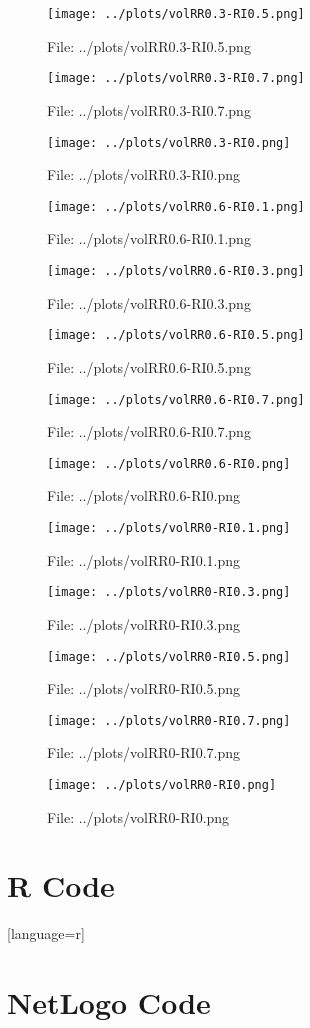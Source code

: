 \documentclass[a4paper, 11pt]{report}
\begin{document}
\begin{figure}[h] \caption{File: ../plots/volRR0.3-RI0.5.png} \texttt{[image: ../plots/volRR0.3-RI0.5.png]} \end{figure}
\begin{figure}[h] \caption{File: ../plots/volRR0.3-RI0.7.png} \texttt{[image: ../plots/volRR0.3-RI0.7.png]} \end{figure}
\begin{figure}[h] \caption{File: ../plots/volRR0.3-RI0.png} \texttt{[image: ../plots/volRR0.3-RI0.png]} \end{figure}
\begin{figure}[h] \caption{File: ../plots/volRR0.6-RI0.1.png} \texttt{[image: ../plots/volRR0.6-RI0.1.png]} \end{figure}
\begin{figure}[h] \caption{File: ../plots/volRR0.6-RI0.3.png} \texttt{[image: ../plots/volRR0.6-RI0.3.png]} \end{figure}
\begin{figure}[h] \caption{File: ../plots/volRR0.6-RI0.5.png} \texttt{[image: ../plots/volRR0.6-RI0.5.png]} \end{figure}
\begin{figure}[h] \caption{File: ../plots/volRR0.6-RI0.7.png} \texttt{[image: ../plots/volRR0.6-RI0.7.png]} \end{figure}
\begin{figure}[h] \caption{File: ../plots/volRR0.6-RI0.png} \texttt{[image: ../plots/volRR0.6-RI0.png]} \end{figure}
\begin{figure}[h] \caption{File: ../plots/volRR0-RI0.1.png} \texttt{[image: ../plots/volRR0-RI0.1.png]} \end{figure}
\begin{figure}[h] \caption{File: ../plots/volRR0-RI0.3.png} \texttt{[image: ../plots/volRR0-RI0.3.png]} \end{figure}
\begin{figure}[h] \caption{File: ../plots/volRR0-RI0.5.png} \texttt{[image: ../plots/volRR0-RI0.5.png]} \end{figure}
\begin{figure}[h] \caption{File: ../plots/volRR0-RI0.7.png} \texttt{[image: ../plots/volRR0-RI0.7.png]} \end{figure}
\begin{figure}[h] \caption{File: ../plots/volRR0-RI0.png} \texttt{[image: ../plots/volRR0-RI0.png]} \end{figure}



\section{R Code}[language=r]
\label{append:r}

\section{NetLogo Code}
\label{append:netlogo}

	
\end{document}
